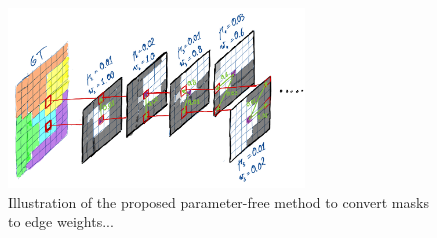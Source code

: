 
\begin{figure}[t]
\centering
        \includegraphics[width=0.7\textwidth]{./figs/alg_explaned.jpg} %
        \caption{  Illustration of the proposed parameter-free method to convert \maskname masks to edge weights...}
    \label{fig:alg_explained}
\end{figure}
